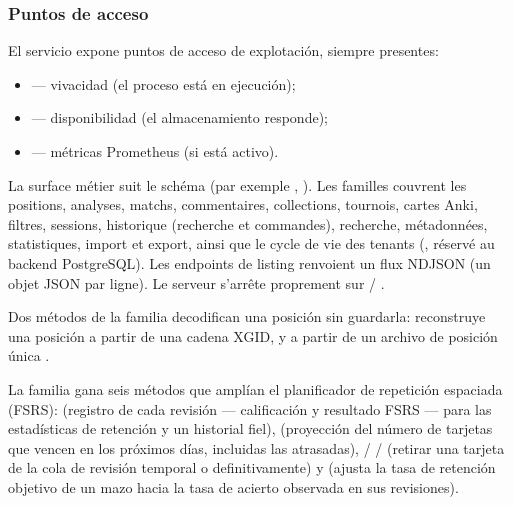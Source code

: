 \documentclass[letterpaper,10pt,spanish]{sphinxmanual}
\begin{document}
\subsubsection{Puntos de acceso}
\label{\detokenize{mode_headless:points-d-acces}}
\sphinxAtStartPar
El servicio expone puntos de acceso de explotación, siempre presentes:
\begin{itemize}
\item {} 
\sphinxAtStartPar
{} — vivacidad (el proceso está en ejecución);

\item {} 
\sphinxAtStartPar
{} — disponibilidad (el almacenamiento responde);

\item {} 
\sphinxAtStartPar
{} — métricas Prometheus (si  está activo).

\end{itemize}

\sphinxAtStartPar
La surface métier suit le schéma  (par exemple
, ). Les familles couvrent les
positions, analyses, matchs, commentaires, collections, tournois, cartes Anki,
filtres, sessions, historique (recherche et commandes), recherche,
métadonnées, statistiques, import et export, ainsi que le cycle de vie des
tenants (, réservé au backend PostgreSQL). Les endpoints de
listing renvoient un flux NDJSON (un objet JSON par ligne). Le serveur
s’arrête proprement sur  / .

\sphinxAtStartPar
Dos métodos de la familia  decodifican una posición sin guardarla:  reconstruye una posición a partir de una cadena XGID, y  a partir de un archivo de posición única .

\sphinxAtStartPar
La familia  gana seis métodos que amplían el planificador de repetición espaciada (FSRS):  (registro de cada revisión — calificación y resultado FSRS — para las estadísticas de retención y un historial fiel),  (proyección del número de tarjetas que vencen en los próximos días, incluidas las atrasadas),  /  /  (retirar una tarjeta de la cola de revisión temporal o definitivamente) y  (ajusta la tasa de retención objetivo de un mazo hacia la tasa de acierto observada en sus revisiones).
\end{document}
